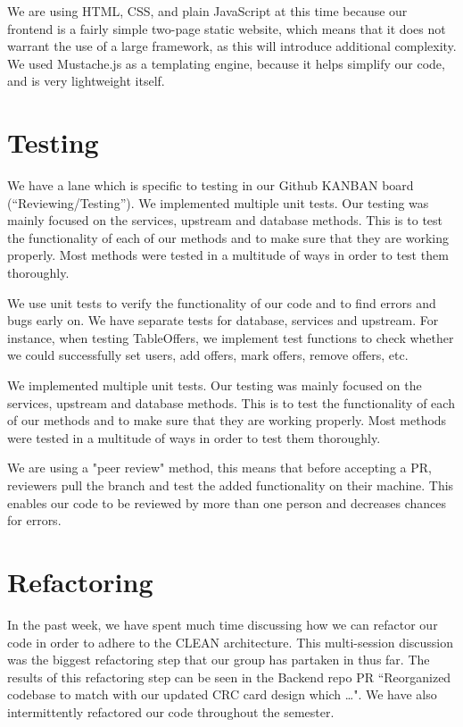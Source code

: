 \documentclass[fontsize=14pt]{article}
\begin{document}
We are using HTML, CSS, and plain JavaScript at this time because our frontend is a fairly simple two-page static website, which means that it does not warrant the use of a large framework, as this will introduce additional complexity. We used Mustache.js as a templating engine, because it helps simplify our code, and is very lightweight itself.

\newpage

\section*{Testing}
We have a lane which is specific to testing in our Github KANBAN board (``Reviewing/Testing''). We implemented multiple unit tests. Our testing was mainly focused on the services, upstream and database methods. This is to test the functionality of each of our methods and to make sure that they are working properly. Most methods were tested in a multitude of ways in order to test them thoroughly.

\noindent
We use unit tests to verify the functionality of our code and to find errors and bugs early on. We have separate tests for database, services and upstream. For instance, when testing TableOffers, we implement test functions to check whether we could successfully set users, add offers, mark offers, remove offers, etc.

We implemented multiple unit tests. Our testing was mainly focused on the services, upstream and database methods. This is to test the functionality of each of our methods and to make sure that they are working properly. Most methods were tested in a multitude of ways in order to test them thoroughly.

\noindent
We are using a "peer review" method, this means that before accepting a PR, reviewers pull the branch and test the added functionality on their machine. This enables our code to be reviewed by more than one person and decreases chances for errors.

\section*{Refactoring}

In the past week, we have spent much time discussing how we can refactor our code in order to adhere to the CLEAN architecture. This multi-session discussion was the biggest refactoring step that our group has partaken in thus far. The results of this refactoring step can be seen in the Backend repo PR ``Reorganized codebase to match with our updated CRC card design which …". We have also intermittently refactored our code throughout the semester.  
\end{document}
